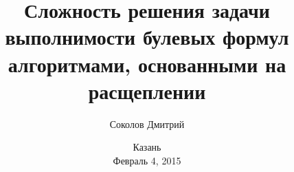 

\title[\insertframenumber/\inserttotalframenumber~|~
Сложность решения задачи выполнимости булевых формул алгоритмами, основанными на расщеплении]
{Сложность решения задачи выполнимости булевых формул алгоритмами, основанными на расщеплении}
\author{Соколов Дмитрий}

\date{Казань\\
	Февраль 4, 2015}



	\maketitle

	
    
    



